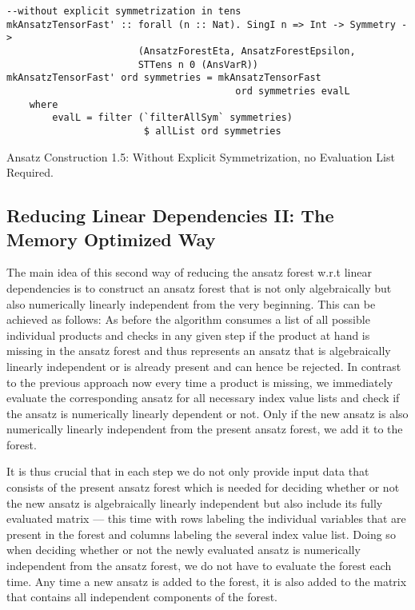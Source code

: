 \begin{listing}[hbt!]
\begin{verbatim}
--without explicit symmetrization in tens
mkAnsatzTensorFast' :: forall (n :: Nat). SingI n => Int -> Symmetry ->
                       (AnsatzForestEta, AnsatzForestEpsilon,
                       STTens n 0 (AnsVarR))
mkAnsatzTensorFast' ord symmetries = mkAnsatzTensorFast
                                        ord symmetries evalL
    where
        evalL = filter (`filterAllSym` symmetries) 
                        $ allList ord symmetries
\end{verbatim} 
\caption{Ansatz Construction 1.5: Without Explicit Symmetrization,  no Evaluation List Required.}\label{mkAnsatzFast'2}
\end{listing}

\subsection*{Reducing Linear Dependencies II:  The Memory Optimized Way}

The main idea of this second way of reducing the ansatz forest w.r.t linear dependencies is to construct an ansatz forest that is not only algebraically but also numerically linearly independent from the very beginning. This can be achieved as follows: As before the algorithm consumes a list of all possible individual products and checks in any given step if the product at hand is missing in the ansatz forest and thus represents an ansatz that is algebraically linearly independent or is already present and can hence be rejected. In contrast to the previous approach now every time a product is missing, we immediately evaluate the corresponding ansatz for all necessary index value lists and check if the ansatz is numerically linearly dependent or not. Only if the new ansatz is also numerically linearly  independent from the present ansatz forest, we add it to the forest.

It is thus crucial that in each step we do not only provide input data that consists of the present ansatz forest which is needed for deciding whether or not the new ansatz is algebraically linearly independent but also include its fully evaluated matrix --- this time with rows labeling the individual variables that are present in the forest and columns labeling the several index value list.
Doing so when deciding whether or not the newly evaluated ansatz is numerically  independent from the ansatz forest, we do not have to evaluate the forest each time. Any time a  new ansatz is added to the forest, it is also added to the matrix that contains all independent components of the forest.

